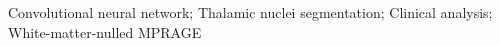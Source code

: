 Convolutional neural network; Thalamic nuclei segmentation; Clinical analysis; White-matter-nulled MPRAGE
